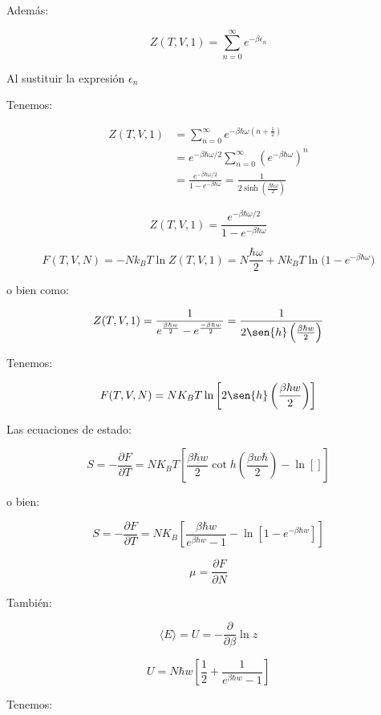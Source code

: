 \documentclass{article}
\begin{document}
Además:


\[ Z(T,V,1) = \sum\limits_{n=0}^{\infty} e^{-\beta\epsilon_{n}}   \]


Al sustituir la expresión $\epsilon_{n}$

Tenemos:

\begin{align}
Z(T,V,1) &= \sum_{n=0}^{\infty} e^{-\beta \hbar \omega\left(n+\tfrac{1}{2}\right)} \\
&= e^{-\beta \hbar \omega/2}\sum_{n=0}^{\infty} \left(e^{-\beta \hbar \omega}\right)^n \\
&= \frac{e^{-\beta \hbar \omega/2}}{1 - e^{-\beta \hbar \omega}}
= \frac{1}{2\sinh\!\left(\tfrac{\beta \hbar \omega}{2}\right)}
\end{align}


\[
Z(T,V,1)=\frac{e^{-\beta \hbar \omega/2}}{1-e^{-\beta \hbar \omega}}
\]

\[
F(T,V,N) = -N k_B T \ln Z(T,V,1)
= N\frac{\hbar \omega}{2} + N k_B T \ln\!\big(1 - e^{-\beta \hbar \omega}\big)
\]



o bien como:


\[  Z(T,V,1) = \frac{1}{ e^{ \frac{\beta \hbar w}{2}}  - e^{ \frac{-\beta \hbar w}{2}}  } = \frac{1}{  2\sen{h}\left(  \frac{\beta \hbar w}{2}  \right)  } \]

Tenemos:


\[F(T,V,N) = NK_{B}T \ln \left[ 2\sen{h} \left( \frac{\beta \hbar w}{2}  \right)   \right]  \]


Las ecuaciones de estado:

\[S = - \frac{\partial F}{\partial T} = NK_{B}T \left[  \frac{\beta \hbar w}{2} \cot{h} \left( \frac{\beta w \hbar}{2}  \right)  - \ln \left[   \right] \right]   \]


o bien:

\[ S = - \frac{\partial F}{\partial T} = NK_{B} \left[  \frac{ \beta \hbar w }{e^{\beta \hbar w} -1 } - \ln \left[ 1  - e^{-\beta \hbar w}\right]\right] \]

\[ \mu = \frac{\partial F}{\partial N} \]


También:

\[ \langle E \rangle = U = - \frac{\partial}{\partial \beta} \ln{z} \]

\[ U = N\hbar w \left[  \frac{1}{2} + \frac{1}{e^{\beta \hbar w} -1}  \right] \]

Tenemos:
\end{document}
